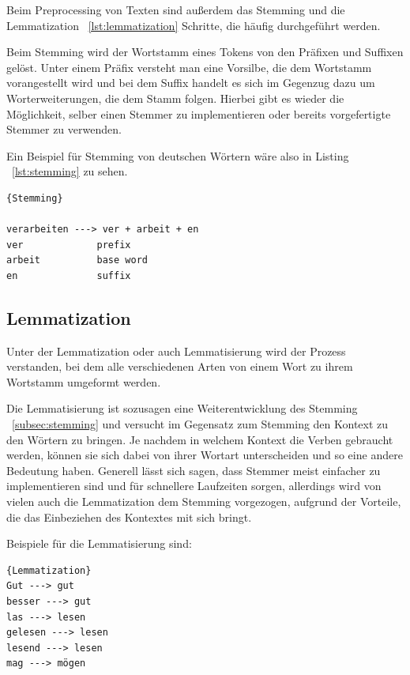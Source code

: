 Beim Preprocessing von Texten sind außerdem das Stemming und die Lemmatization ~\ref{lst:lemmatization} Schritte, die häufig durchgeführt werden.

Beim Stemming wird der Wortstamm eines Tokens von den Präfixen und Suffixen gelöst.
Unter einem Präfix versteht man eine Vorsilbe, die dem Wortstamm vorangestellt wird und bei dem Suffix handelt es sich im Gegenzug dazu um Worterweiterungen, die dem Stamm folgen.
Hierbei gibt es wieder die Möglichkeit, selber einen Stemmer zu implementieren oder bereits vorgefertigte Stemmer zu verwenden.\cite{textAnalysisMonkeylearn, machineLearningTextAnalysis}

Ein Beispiel für Stemming von deutschen Wörtern wäre also in Listing ~\ref{lst:stemming} zu sehen.

\begin{lstlisting}[label={lst:stemming},caption={Stemming von deutschen Wörtern}]{Stemming}

verarbeiten ---> ver + arbeit + en
ver             prefix
arbeit          base word
en              suffix
\end{lstlisting}

\subsection{Lemmatization}\label{subsec:lemmatization}

Unter der Lemmatization oder auch Lemmatisierung wird der Prozess verstanden, bei dem alle verschiedenen Arten von einem Wort zu ihrem Wortstamm umgeformt werden.

Die Lemmatisierung ist sozusagen eine Weiterentwicklung des Stemming ~\ref{subsec:stemming} und versucht im Gegensatz zum Stemming den Kontext zu den Wörtern zu bringen.
Je nachdem in welchem Kontext die Verben gebraucht werden, können sie sich dabei von ihrer Wortart unterscheiden und so eine andere Bedeutung haben.
Generell lässt sich sagen, dass Stemmer meist einfacher zu implementieren sind und für schnellere Laufzeiten sorgen, allerdings wird von vielen auch die Lemmatization dem Stemming vorgezogen, aufgrund der Vorteile, die das Einbeziehen des Kontextes mit sich bringt.\cite{machineLearningTextAnalysis, textAnalysisMonkeylearn, stemmingLemmatization}


Beispiele für die Lemmatisierung sind:

\begin{lstlisting}[label={lst:lemmatization},caption={Lemmatisierung von deutschen Wörtern}]{Lemmatization}
Gut ---> gut
besser ---> gut
las ---> lesen
gelesen ---> lesen
lesend ---> lesen
mag ---> mögen

\end{lstlisting}

